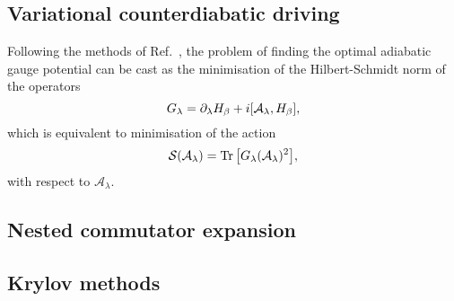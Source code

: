         \subsection{Variational counterdiabatic driving}
        Following the methods of Ref.~\cite{sels_minimizing_2017}, the problem of finding the optimal adiabatic gauge potential can be cast as the minimisation of the Hilbert-Schmidt norm of the operators
        \begin{equation}\label{eq:Goperator}
         G_{\lambda}= \partial_{\lambda}H_\beta + i\comm{\mathcal{A}_\lambda}{H_\beta},
        \end{equation}
        which is equivalent to minimisation of the action
        \begin{equation}\label{eq:actionCD}
        \mathcal{S}(\mathcal{A}_{\lambda}) = \Trace{\left[G_{\lambda}(\mathcal{A}_{\lambda})^2\right]},
        \end{equation}
        with respect to $\mathcal{A}_{\lambda}$.
        \subsection{Nested commutator expansion}
        \subsection{Krylov methods}
